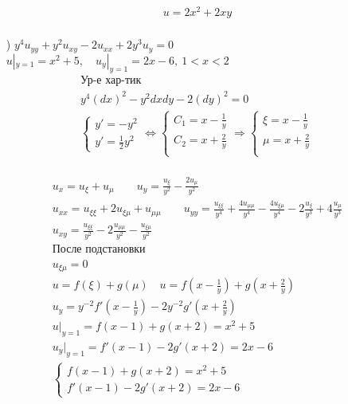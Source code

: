 \begin{enumerate}
\begin{gather*}
    \boxed{u=2x^{2}+2xy} \\
  \end{gather*}
\item[\text{д})] $y^{4}u_{yy}+y^{2}u_{xy}-2u_{xx}+2y^{3}u_{y}=0$ \\
  $u|_{y=1}=x^{2}+5, \quad u_{y}|_{y=1}=2x-6, \ 1<x<2$ \\
  \begin{gather*}
    \text{Ур-е хар-тик} \\
    y^{4}(dx)^{2}-y^{2}dxdy-2(dy)^{2}=0 \\
    \begin{cases}
      y' = -y^{2} \\ y' =\frac{1}{2}y^{2} 
    \end{cases} \Leftrightarrow
    \begin{cases}
      C_{1} = x - \frac{1}{y} \\ C_{2} = x + \frac{2}{y} \\
    \end{cases} \Rightarrow
    \begin{cases}
      \xi = x - \frac{1}{y} \\ \mu = x + \frac{2}{y} \\
    \end{cases}
  \end{gather*} \\
\begin{gather*}
  u_{x} = u_{\xi} +u_{\mu} \qquad u_{y} = \frac{u_{\xi}}{y^{2}} - \frac{2u_{\mu}}{y^{2}} \\
  u_{xx}=u_{\xi\xi}+2u_{\xi\mu}+u_{\mu\mu} \qquad u_{yy}= \frac{u_{\xi\xi}}{y^{4}}+ \frac{4u_{\mu\mu}}{y^{4}}
  - \frac{4u_{\xi\mu}}{y^{4}}-2 \frac{u_{\xi}}{y^{3}}+ 4 \frac{u_{\mu}}{y^{3}} \\
  u_{xy}= \frac{u_{\xi\xi}}{y^{2}} - 2 \frac{u_{\mu\mu}}{y^{2}} - \frac{u_{\xi\mu}}{y^{2}} \\
  \text{После подстановки} \\
  u_{\xi\mu} = 0 \\
  u = f(\xi)+g(\mu) \quad u = f(x - \frac{1}{y})+g(x+ \frac{2}{y}) \\
  u_{y}=y^{-2}f'(x- \frac{1}{y})-2y^{-2}g'(x+ \frac{2}{y}) \\
  u|_{y=1}=f(x-1)+g(x+2)=x^{2}+5 \\ u_{y}|_{y=1}=f'(x-1)-2g'(x+2)=2x-6 \\
  \begin{cases}
    f(x-1)+g(x+2)=x^{2}+5 \\ f'(x-1)-2g'(x+2)=2x-6

\end{cases}
\end{gather*}
\end{enumerate}
